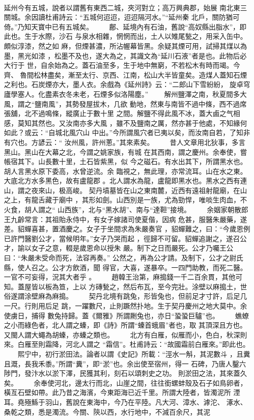 \documentclass{ctexart}
\begin{document}
\paragraph{}
延州今有五城，說者以謂舊有東西二城，夾河對立；高万興典郡，始展 南北東三關城。余因讀杜甫詩云：``五城何迢迢，迢迢隔河水。''``延州秦 北戶，關防猶可倚。''乃知天寶中已有五城矣。 　　鄜、延境內有石油，舊說``高奴縣出脂水''，即此也。生于水際，沙石 与泉水相雜，惘惘而出，土人以雉尾甃之，用采入缶中。頗似淳漆，然之如 麻，但煙甚濃，所沾幄幕皆黑。余疑其煙可用，試掃其煤以為墨，黑光如漆 ，松墨不及也，遂大為之，其識文為``延川石液''者是也。此物后必大行于 世，自余始為之。蓋石油至多，生于地中無窮，不若松木有時而竭。今齊、 魯間松林盡矣，漸至太行、京西、江南，松山大半皆童矣。造煤人蓋知石煙 之利也。石炭煙亦大，墨人衣。余戲為《延州詩》云：``二郎山下雪紛紛， 旋卓穹廬學塞人。化盡素衣冬未老，石煙多似洛陽塵。'' 　　解州鹽澤之南，秋夏間多大風，謂之``鹽南風''，其勢發屋拔木，几欲 動地，然東与南皆不過中條，西不過席張舖，北不過鳴條，縱廣止于數十里 之間。解鹽不得此風不冰，蓋大鹵之气相感，莫知其然也。又汝南亦多大風 ，雖不及鹽南之厲，然亦甚于他處，不知緣何如此？或云：``自城北風穴山 中出。''今所謂風穴者已夷以矣，而汝南自若，了知非有穴也。方諺云：`` 汝州風，許州蔥。''其來素矣。 　　昔人文章用北狄事，多言黑山。黑山在大幕之北，今謂之姚家族，有城 在其西南，謂之慶州。余奉使，嘗帳宿其下。山長數十里，土石皆紫黑，似 今之磁石。有水出其下，所謂黑水也。胡人言黑水原下委高，水曾逆流。余 臨視之，無此理，亦常流耳。山在水之東。大底北方水多黑色，故有盧龍郡 。北人謂水為龍，盧龍即黑水也。黑水之西有連山，謂之夜來山，极高峻。 契丹墳墓皆在山之東南麓，近西有遠祖射龍廟，在山之上，有龍舌藏于廟中 ，其形如劍。山西別是一族，尤為勁悍，唯啖生肉血，不火食，胡人謂之`` 山西族''，北与``黑水胡''、南与``達靼''接境。 　　余姻家朝散郎王九齡常言：其祖貽永侍中，有女子嫁諸司使夏偕，因病 危甚，服醫朱嚴藥，遂差。貂蟬喜甚，置酒慶之。女子于坐間求為朱嚴奏官 ，貂蟬難之，曰：``今歲恩例已許門醫劉公才，當候明年。''女子乃哭而起 ，徑歸不可留。貂蟬追謝之，遂召公才，諭以女子之意，輟是歲恩命以授朱 嚴。制下之日而嚴死。公才乃囑王公曰：``朱嚴未受命而死，法容再奏。'' 公然之，再為公才請。及制下，公才之尉氏縣，使人召之。公才方飲酒，聞 得官，大喜，遂暴卒。一四門助教，而死二醫。一官不可妄得，況其大者乎 。 　　趙韓王治第，麻搗錢一千二百余貫，其他可知。蓋屋皆以板為笪，上以 方磚甃之，然后布瓦，至今完壯。涂壁以麻搗土，世俗遂謂涂壁麻為麻搗。 　　契丹北境有跳兔，形皆兔也，但前足才寸許，后足几一尺。行則用后足 跳，一躍數尺，止則蹶然扑地。生于契丹慶州之地大莫中。余使虜日，捕得 數兔持歸。蓋《爾雅》所謂劂兔也，亦日``蛩蛩巨驢''也。 　　蟭蟟之小而綠色者，北人謂之螓，即《詩》所謂``螓首蛾眉''者也，取 其頂深且方也。又閩人謂大蠅為胡螓，亦螓之類也。 　　北方有白雁，似雁而小，色白，秋深則來。白雁至則霜降，河北人謂之 ``霜信''。杜甫詩云：``故國霜前白雁來。''即此也。 　　熙宁中，初行淤田法。論者以謂《史記》所載：``涇水一斛，其泥數斗 ，且糞且溉，長我禾黍。''所謂``糞''，即``淤''也。余出使至宿州，得一 石碑，乃唐人鑿六陟門，發汴水以淤下澤，民獲其利，刻石以頌刺史之功。 則淤田之法，其來蓋久矣。 　　余奉使河北，邊太行而北，山崖之間，往往銜螺蚌殼及石子如鳥卵者， 橫亙石壁如帶。此乃昔之海濱，今東距海已近千里。所謂大陸者，皆濁泥所 湮耳。堯殛鯀于羽山，舊說在東海中，今乃在平陸。凡大河、漳水、滹沱、 涿水、桑乾之類，悉是濁流。今關、陝以西，水行地中，不減百余尺，其泥 
\end{document}
